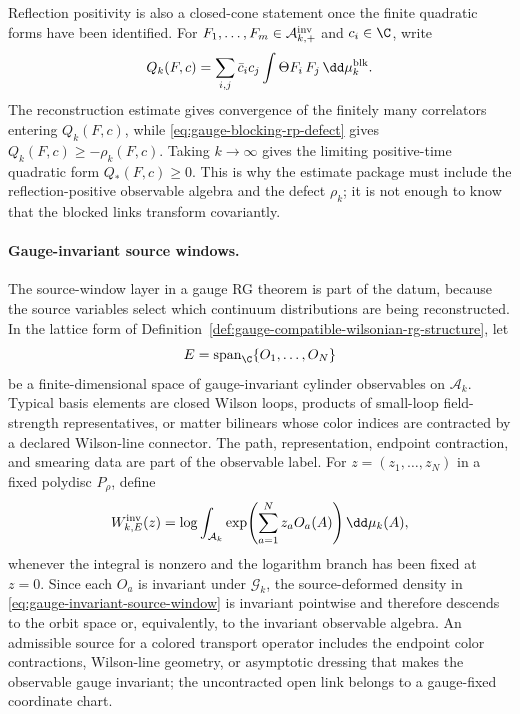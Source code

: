 Reflection positivity is also a closed-cone statement once the finite
quadratic forms have been identified.  For
\(F_1,\ldots,F_m\in\mathcal A_{k,+}^{\rm inv}\) and \(c_i\in\C\), write
\[
  Q_k(F,c)=
  \sum_{i,j}\bar c_i c_j
  \int \Theta F_i\,F_j\,\dd\mu_k^{\rm blk}.
\]
The reconstruction estimate gives convergence of the finitely many
correlators entering \(Q_k(F,c)\), while
\eqref{eq:gauge-blocking-rp-defect} gives
\(Q_k(F,c)\geq-\rho_k(F,c)\).  Taking \(k\to\infty\) gives the limiting
positive-time quadratic form \(Q_\ast(F,c)\geq0\).  This is why the estimate package must
include the reflection-positive observable algebra and the defect
\(\rho_k\); it is not enough to know that the blocked links transform
covariantly.

\paragraph{Gauge-invariant source windows.}
The source-window layer in a gauge RG theorem is part of the datum, because
the source variables select which continuum distributions are being
reconstructed.  In the lattice form of
Definition~\ref{def:gauge-compatible-wilsonian-rg-structure}, let
\[
  E=\operatorname{span}_{\C}\{O_1,\ldots,O_N\}
\]
be a finite-dimensional space of gauge-invariant cylinder observables on
\(\mathcal A_k\).  Typical basis elements are closed Wilson loops, products
of small-loop field-strength representatives, or matter bilinears whose
color indices are contracted by a declared Wilson-line connector.  The path,
representation, endpoint contraction, and smearing data are part of the
observable label.  For \(z=(z_1,\ldots,z_N)\) in a fixed polydisc \(P_\rho\),
define
\begin{equation}
  W_{k,E}^{\rm inv}(z)
  =
  \log
  \int_{\mathcal A_k}
    \exp\!\left(\sum_{a=1}^N z_a O_a(A)\right)
    \dd\mu_k(A),
  \label{eq:gauge-invariant-source-window}
\end{equation}
whenever the integral is nonzero and the logarithm branch has been fixed at
\(z=0\).  Since each \(O_a\) is invariant under \(\mathcal G_k\), the
source-deformed density in
\eqref{eq:gauge-invariant-source-window} is invariant pointwise and therefore
descends to the orbit space or, equivalently, to the invariant observable
algebra.  An admissible source for a colored transport operator includes the
endpoint color contractions, Wilson-line geometry, or asymptotic dressing
that makes the observable gauge invariant; the uncontracted open link belongs
to a gauge-fixed coordinate chart.

